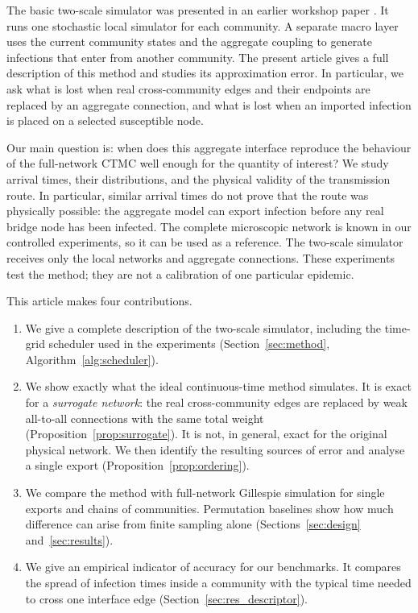 The basic two-scale simulator was presented in an earlier workshop paper \citep{kuryliak2025towards}. It runs one stochastic local simulator for each community. A separate macro layer uses the current community states and the aggregate coupling to generate infections that enter from another community. The present article gives a full description of this method and studies its approximation error. In particular, we ask what is lost when real cross-community edges and their endpoints are replaced by an aggregate connection, and what is lost when an imported infection is placed on a selected susceptible node.

Our main question is: when does this aggregate interface reproduce the behaviour of the full-network CTMC well enough for the quantity of interest? We study arrival times, their distributions, and the physical validity of the transmission route. In particular, similar arrival times do not prove that the route was physically possible: the aggregate model can export infection before any real bridge node has been infected. The complete microscopic network is known in our controlled experiments, so it can be used as a reference. The two-scale simulator receives only the local networks and aggregate connections. These experiments test the method; they are not a calibration of one particular epidemic.

This article makes four contributions.
\begin{enumerate}
\item We give a complete description of the two-scale simulator, including the time-grid scheduler used in the experiments (Section~\ref{sec:method}, Algorithm~\ref{alg:scheduler}).
\item We show exactly what the ideal continuous-time method simulates. It is exact for a \emph{surrogate network}: the real cross-community edges are replaced by weak all-to-all connections with the same total weight (Proposition~\ref{prop:surrogate}). It is not, in general, exact for the original physical network. We then identify the resulting sources of error and analyse a single export (Proposition~\ref{prop:ordering}).
\item We compare the method with full-network Gillespie simulation for single exports and chains of communities. Permutation baselines show how much difference can arise from finite sampling alone (Sections~\ref{sec:design} and~\ref{sec:results}).
\item We give an empirical indicator of accuracy for our benchmarks. It compares the spread of infection times inside a community with the typical time needed to cross one interface edge (Section~\ref{sec:res_descriptor}).
\end{enumerate}

